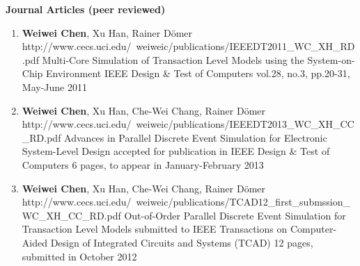 

%
%



{\textbf{\large Journal Articles (peer reviewed)}}
\vspace{-2mm}
\begin{enumerate}

\item 
	\mypubhl
	{\textbf{Weiwei Chen}, Xu Han, Rainer D\"{o}mer}
	{http://www.cecs.uci.edu/~weiweic/publications/IEEEDT2011_WC_XH_RD.pdf}
	{Multi-Core Simulation of Transaction Level Models using the System-on-Chip Environment}
	{}
	{IEEE Design \& Test of Computers}
	{vol.28, no.3, pp.20-31, May-June 2011}
		
\item 
	\mypubhl
	{\textbf{Weiwei Chen}, Xu Han, Che-Wei Chang, Rainer D\"{o}mer}
	{http://www.cecs.uci.edu/~weiweic/publications/IEEEDT2013_WC_XH_CC_RD.pdf}
	{Advances in Parallel Discrete Event Simulation for Electronic System-Level Design} 
	{accepted for publication in }
	{IEEE Design \& Test of Computers}
	{6 pages, to appear in January-February 2013}
	
\item  
	\mypubhl
	{\textbf{Weiwei Chen}, Xu Han, Che-Wei Chang, Rainer D\"{o}mer}
	{http://www.cecs.uci.edu/~weiweic/publications/TCAD12_first_submssion_WC_XH_CC_RD.pdf}
	{Out-of-Order Parallel Discrete Event Simulation for Transaction Level Models} 
	{submitted to }
	{IEEE Transactions on Computer-Aided Design of Integrated Circuits and Systems (TCAD)} 
	{12 pages, submitted in October 2012}
	
\end{enumerate}

